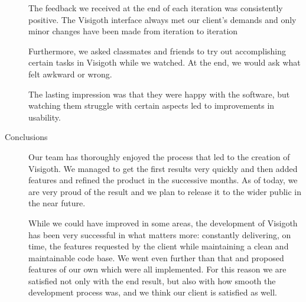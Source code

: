 \documentclass[a4paper,11pt]{article}
\begin{document}
\begin{description}
	The feedback we received at the end of each iteration was consistently
	positive. The Visigoth interface always met our client's demands and
	only minor changes have been made from iteration to iteration

	Furthermore, we asked classmates and friends to try
	out accomplishing certain tasks in Visigoth while we watched. At the
	end, we would ask what felt awkward or wrong.

	The lasting impression was that they were happy with the software, but
	watching them struggle with certain aspects led to improvements in
	usability.

	\item[Conclusions]

    Our team has thoroughly enjoyed the process that led to the creation of
    Visigoth. We managed to get the first results very quickly and then added
    features and refined the product in the successive months. As of today, we
    are very proud of the result and we plan to release it to the wider public
    in the near future.

    While we could have improved in some areas, the development of Visigoth has
    been very successful in what matters more: constantly delivering, on time,
    the features requested by the client while maintaining a clean and
    maintainable code base. We went even further than that and proposed features
    of our own which were all implemented. For this reason we are satisfied not
    only with the end result, but also with how smooth the development process
    was, and we think our client is satisfied as well.

\end{description}
\end{document}
